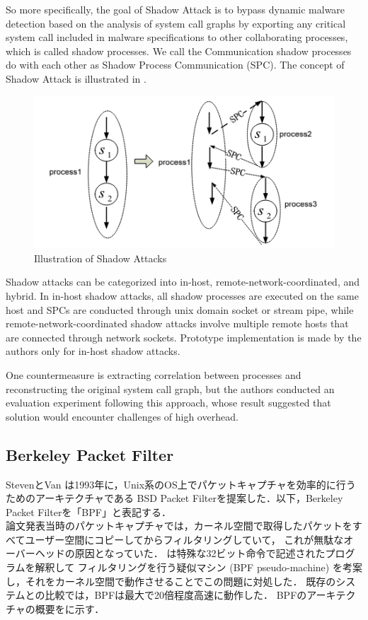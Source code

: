 So more specifically, the goal of Shadow Attack is to bypass dynamic malware detection based on
the analysis of system call graphs by exporting any critical system call included in malware specifications to
other collaborating processes, which is called shadow processes.
We call the Communication shadow processes do with each other as Shadow Process Communication (SPC).
The concept of Shadow Attack is illustrated in .
\begin{figure}[tp]
  \begin{center}
    \includegraphics[width=\columnwidth]{./img/archi_SA.png}
  \end{center}
  \caption{Illustration of Shadow Attacks
    \cite{Weiqin:ShadowAttack}}
  \label{img:shadow-attack}
\end{figure}

Shadow attacks can be categorized into in-host, remote-network-coordinated, and hybrid.
In in-host shadow attacks, all shadow processes are executed on the same host and SPCs are conducted through
unix domain socket or stream pipe, while remote-network-coordinated shadow attacks involve multiple remote hosts
that are connected through network sockets.
Prototype implementation is made by the authors only for in-host shadow attacks.

One countermeasure is extracting correlation between processes and reconstructing
the original system call graph, but the authors conducted an evaluation experiment following this approach,
whose result suggested that solution would encounter challenges of high overhead.




\subsection{Berkeley Packet Filter}
StevenとVan \cite{mccanne1993bsd}は1993年に，Unix系のOS上でパケットキャプチャを効率的に行うためのアーキテクチャである
BSD Packet Filterを提案した．以下，Berkeley Packet Filterを「BPF」と表記する． \\
論文発表当時のパケットキャプチャでは，カーネル空間で取得したパケットをすべてユーザー空間にコピーしてからフィルタリングしていて，
これが無駄なオーバーヘッドの原因となっていた．
\cite{mccanne1993bsd}は特殊な32ビット命令で記述されたプログラムを解釈して
フィルタリングを行う疑似マシン (BPF pseudo-machine) を考案し，それをカーネル空間で動作させることでこの問題に対処した．
既存のシステムとの比較では，BPFは最大で20倍程度高速に動作した．
BPFのアーキテクチャの概要をに示す．


